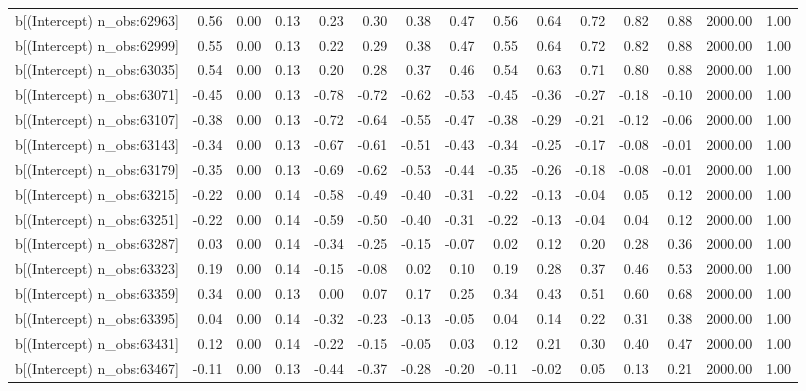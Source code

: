 \begin{table}[ht]
\begin{tabular}{rrrrrrrrrrrrrrr}
  b[(Intercept) n\_obs:62963] & 0.56 & 0.00 & 0.13 & 0.23 & 0.30 & 0.38 & 0.47 & 0.56 & 0.64 & 0.72 & 0.82 & 0.88 & 2000.00 & 1.00 \\ 
  b[(Intercept) n\_obs:62999] & 0.55 & 0.00 & 0.13 & 0.22 & 0.29 & 0.38 & 0.47 & 0.55 & 0.64 & 0.72 & 0.82 & 0.88 & 2000.00 & 1.00 \\ 
  b[(Intercept) n\_obs:63035] & 0.54 & 0.00 & 0.13 & 0.20 & 0.28 & 0.37 & 0.46 & 0.54 & 0.63 & 0.71 & 0.80 & 0.88 & 2000.00 & 1.00 \\ 
  b[(Intercept) n\_obs:63071] & -0.45 & 0.00 & 0.13 & -0.78 & -0.72 & -0.62 & -0.53 & -0.45 & -0.36 & -0.27 & -0.18 & -0.10 & 2000.00 & 1.00 \\ 
  b[(Intercept) n\_obs:63107] & -0.38 & 0.00 & 0.13 & -0.72 & -0.64 & -0.55 & -0.47 & -0.38 & -0.29 & -0.21 & -0.12 & -0.06 & 2000.00 & 1.00 \\ 
  b[(Intercept) n\_obs:63143] & -0.34 & 0.00 & 0.13 & -0.67 & -0.61 & -0.51 & -0.43 & -0.34 & -0.25 & -0.17 & -0.08 & -0.01 & 2000.00 & 1.00 \\ 
  b[(Intercept) n\_obs:63179] & -0.35 & 0.00 & 0.13 & -0.69 & -0.62 & -0.53 & -0.44 & -0.35 & -0.26 & -0.18 & -0.08 & -0.01 & 2000.00 & 1.00 \\ 
  b[(Intercept) n\_obs:63215] & -0.22 & 0.00 & 0.14 & -0.58 & -0.49 & -0.40 & -0.31 & -0.22 & -0.13 & -0.04 & 0.05 & 0.12 & 2000.00 & 1.00 \\ 
  b[(Intercept) n\_obs:63251] & -0.22 & 0.00 & 0.14 & -0.59 & -0.50 & -0.40 & -0.31 & -0.22 & -0.13 & -0.04 & 0.04 & 0.12 & 2000.00 & 1.00 \\ 
  b[(Intercept) n\_obs:63287] & 0.03 & 0.00 & 0.14 & -0.34 & -0.25 & -0.15 & -0.07 & 0.02 & 0.12 & 0.20 & 0.28 & 0.36 & 2000.00 & 1.00 \\ 
  b[(Intercept) n\_obs:63323] & 0.19 & 0.00 & 0.14 & -0.15 & -0.08 & 0.02 & 0.10 & 0.19 & 0.28 & 0.37 & 0.46 & 0.53 & 2000.00 & 1.00 \\ 
  b[(Intercept) n\_obs:63359] & 0.34 & 0.00 & 0.13 & 0.00 & 0.07 & 0.17 & 0.25 & 0.34 & 0.43 & 0.51 & 0.60 & 0.68 & 2000.00 & 1.00 \\ 
  b[(Intercept) n\_obs:63395] & 0.04 & 0.00 & 0.14 & -0.32 & -0.23 & -0.13 & -0.05 & 0.04 & 0.14 & 0.22 & 0.31 & 0.38 & 2000.00 & 1.00 \\ 
  b[(Intercept) n\_obs:63431] & 0.12 & 0.00 & 0.14 & -0.22 & -0.15 & -0.05 & 0.03 & 0.12 & 0.21 & 0.30 & 0.40 & 0.47 & 2000.00 & 1.00 \\ 
  b[(Intercept) n\_obs:63467] & -0.11 & 0.00 & 0.13 & -0.44 & -0.37 & -0.28 & -0.20 & -0.11 & -0.02 & 0.05 & 0.13 & 0.21 & 2000.00 & 1.00 \\ 

\end{tabular}
\end{table}
